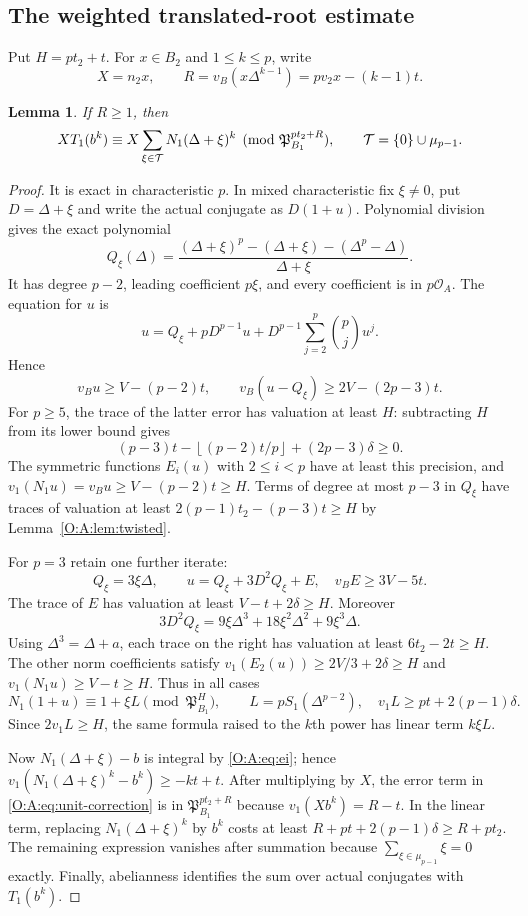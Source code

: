 \documentclass[11pt]{amsart}
\newtheorem{lemma}[theorem]{Lemma}
\theoremstyle{definition}
\theoremstyle{remark}
\newcommand{\floor}[1]{\left\lfloor #1\right\rfloor}
\newcommand{\OO}{\mathcal O}\newcommand{\pp}{\mathfrak p}\newcommand{\PP}{\mathfrak P}
\begin{document}
\subsection{The weighted translated-root estimate}
Put $H=pt_2+t$.  For $x\in B_2$ and $1\le k\le p$, write
\[
 X=n_2x,\qquad R=v_B(x\Delta^{k-1})=pv_2x-(k-1)t.
\]
\begin{lemma}\label{O:A:lem:translate}
If $R\ge1$, then
\[
 X T_1(b^k)\equiv X\sum_{\xi\in\TT}N_1(\Delta+\xi)^k
 \pmod{\PP_{B_1}^{pt_2+R}},\qquad\TT=\{0\}\cup\mu_{p-1}.
\]
\end{lemma}
\begin{proof}
It is exact in characteristic $p$.  In mixed characteristic fix $\xi\ne0$,
put $D=\Delta+\xi$ and write the actual conjugate as $D(1+u)$.
Polynomial division gives the exact polynomial
\[
 Q_\xi(\Delta)=\frac{(\Delta+\xi)^p-(\Delta+\xi)-(\Delta^p-\Delta)}
                         {\Delta+\xi}.
\]
It has degree $p-2$, leading coefficient $p\xi$, and every coefficient is
in $p\OO_A$.  The equation for $u$ is
\[
 u=Q_\xi+pD^{p-1}u+D^{p-1}\sum_{j=2}^p\binom pj u^j.
\]
Hence
\[
 v_Bu\ge V-(p-2)t,\qquad
 v_B(u-Q_\xi)\ge2V-(2p-3)t.
\]
For $p\ge5$, the trace of the latter error has valuation at least $H$:
subtracting $H$ from its lower bound gives
\[
 (p-3)t-\floor{(p-2)t/p}+(2p-3)\delta\ge0.
\]
The symmetric functions $E_i(u)$ with $2\le i<p$ have at least this precision,
and $v_1(N_1u)=v_Bu\ge V-(p-2)t\ge H$.  Terms of degree at most $p-3$ in $Q_\xi$ have traces of
valuation at least
$2(p-1)t_2-(p-3)t\ge H$ by Lemma~\ref{O:A:lem:twisted}.

For $p=3$ retain one further iterate:
\[
 Q_\xi=3\xi\Delta,\qquad
 u=Q_\xi+3D^2Q_\xi+E,\quad v_BE\ge3V-5t.
\]
The trace of $E$ has valuation at least $V-t+2\delta\ge H$.
Moreover
\[
 3D^2Q_\xi=9\xi\Delta^3+18\xi^2\Delta^2+9\xi^3\Delta.
\]
Using $\Delta^3=\Delta+a$, each trace on the right has valuation at least
$6t_2-2t\ge H$.  The other norm coefficients satisfy
$v_1(E_2(u))\ge2V/3+2\delta\ge H$ and
$v_1(N_1u)\ge V-t\ge H$.
Thus in all cases
\begin{equation}
 N_1(1+u)\equiv1+\xi L\pmod{\PP_{B_1}^H},\qquad
 L=pS_1(\Delta^{p-2}),\quad
 v_1L\ge pt+2(p-1)\delta.\label{O:A:eq:unit-correction}
\end{equation}
Since $2v_1L\ge H$, the same formula raised to the $k$th power has linear
term $k\xi L$.

Now $N_1(\Delta+\xi)-b$ is integral by \eqref{O:A:eq:ei}; hence
$v_1(N_1(\Delta+\xi)^k-b^k)\ge-kt+t$.
After multiplying by $X$, the error term in \eqref{O:A:eq:unit-correction}
is in $\PP_{B_1}^{pt_2+R}$ because $v_1(Xb^k)=R-t$.
In the linear term, replacing $N_1(\Delta+\xi)^k$ by $b^k$ costs at least
$R+pt+2(p-1)\delta\ge R+pt_2$.
The remaining expression vanishes after summation because
$\sum_{\xi\in\mu_{p-1}}\xi=0$ exactly.
Finally, abelianness identifies the sum over actual conjugates with
$T_1(b^k)$.
\end{proof}
\end{document}
